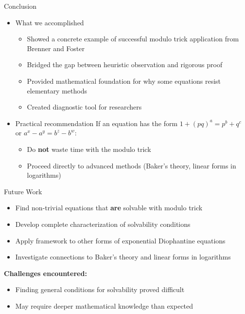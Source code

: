 \begin{frame}{Conclusion}
\begin{itemize}
    \item[] \begin{block}{What we accomplished}
        \begin{itemize}
            \item Showed a concrete example of successful modulo trick application from Brenner and Foster
            \item Bridged the gap between heuristic observation and rigorous proof
            \item Provided mathematical foundation for why some equations resist elementary methods
            \item Created diagnostic tool for researchers
        \end{itemize}
    \end{block}
    
    \item[] \begin{block}{Practical recommendation}
        If an equation has the form $1+(pq)^a = p^b+q^c$ or $a^x-a^y = b^z-b^w$:
        \begin{itemize}
            \item Do \textbf{not} waste time with the modulo trick
            \item Proceed directly to advanced methods (Baker's theory, linear forms in logarithms)
        \end{itemize}
    \end{block}
\end{itemize}

\end{frame}

\begin{frame}{Future Work}
    \begin{itemize}
        \item Find non-trivial equations that \textbf{are} solvable with modulo trick
        \item Develop complete characterization of solvability conditions
        \item Apply framework to other forms of exponential Diophantine equations
        \item Investigate connections to Baker's theory and linear forms in logarithms
    \end{itemize}
    
    \vspace{0.5cm}
    \textbf{Challenges encountered:}
    \begin{itemize}
        \item Finding general conditions for solvability proved difficult
        \item May require deeper mathematical knowledge than expected
    \end{itemize}
\end{frame}

